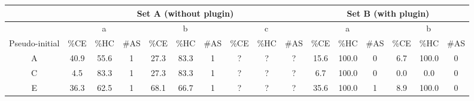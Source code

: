 \begin{landscape}
\begin{table}[p]
  \begin{tabular}{@{}cccccccccccccccc@{}}
    \toprule
    \multicolumn{1}{l}{}       & \multicolumn{9}{c}{Set A (without plugin)}                                                                                                                                              & \multicolumn{6}{c}{Set B (with plugin)}                                                                                                     \\ \midrule
                               & \multicolumn{3}{c}{a} & \multicolumn{3}{c}{b}                                                          & \multicolumn{3}{c}{c}                                                          & \multicolumn{3}{c}{a}                                      & \multicolumn{3}{c}{b}                                                          \\ \midrule
    Pseudo-initial             & \%CE  & \%HC  & \#AS  & \multicolumn{1}{l}{\%CE} & \multicolumn{1}{l}{\%HC} & \multicolumn{1}{l}{\#AS} & \multicolumn{1}{l}{\%CE} & \multicolumn{1}{l}{\%HC} & \multicolumn{1}{l}{\#AS} & \%CE & \multicolumn{1}{l}{\%HC} & \multicolumn{1}{l}{\#AS} & \multicolumn{1}{l}{\%CE} & \multicolumn{1}{l}{\%HC} & \multicolumn{1}{l}{\#AS} \\ \midrule
    A                          & 40.9  & 55.6  & 1     & 27.3                     & 83.3                     & 1                        & ?                        & ?                        & ?                        & 15.6 & 100.0                    & 0                        & 6.7                      & 100.0                    & 0                        \\
    C                          & 4.5   & 83.3  & 1     & 27.3                     & 83.3                     & 1                        & ?                        & ?                        & ?                        & 6.7  & 100.0                    & 0                        & 0.0                      & 0.0                      & 0                        \\
    E                          & 36.3  & 62.5  & 1     & 68.1                     & 66.7                     & 1                        & ?                        & ?                        & ?                        & 35.6 & 100.0                    & 1                        & 8.9                      & 100.0                    & 0                        \\

\end{tabular}
\end{table}
\end{landscape}
